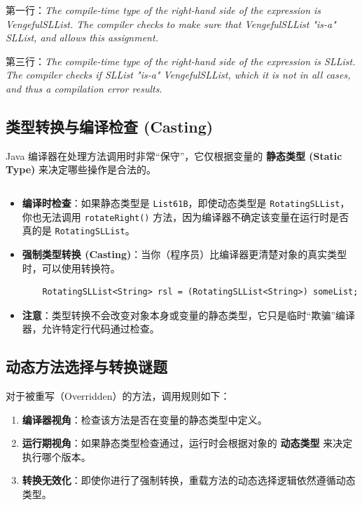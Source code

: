\documentclass[12pt, a4paper, openany]{ctexbook} %
\begin{document}
\par
第一行：\textit{The compile-time type of the right-hand side of the expression is VengefulSLList. The compiler checks to make sure that VengefulSLList "is-a" SLList, and allows this assignment.}
\par
第三行：\textit{The compile-time type of the right-hand side of the expression is SLList. The compiler checks if SLList "is-a" VengefulSLList, which it is not in all cases, and thus a compilation error results.}



\subsection{类型转换与编译检查 (Casting)}
Java 编译器在处理方法调用时非常“保守”，它仅根据变量的 \textbf{静态类型 (Static Type)} 来决定哪些操作是合法的。
\begin{lstlisting}

\end{lstlisting}

\begin{itemize}
    \item \textbf{编译时检查}：如果静态类型是 \texttt{List61B}，即使动态类型是 \texttt{RotatingSLList}，你也无法调用 \texttt{rotateRight()} 方法，因为编译器不确定该变量在运行时是否真的是 \texttt{RotatingSLList}。
    \item \textbf{强制类型转换 (Casting)}：当你（程序员）比编译器更清楚对象的真实类型时，可以使用转换符。
    \begin{lstlisting}
    RotatingSLList<String> rsl = (RotatingSLList<String>) someList;
    \end{lstlisting}
    \item \textbf{注意}：类型转换不会改变对象本身或变量的静态类型，它只是临时“欺骗”编译器，允许特定行代码通过检查。
\end{itemize}

\subsection{动态方法选择与转换谜题}
对于被重写（Overridden）的方法，调用规则如下：
\begin{enumerate}
    \item \textbf{编译器视角}：检查该方法是否在变量的静态类型中定义。
    \item \textbf{运行期视角}：如果静态类型检查通过，运行时会根据对象的 \textbf{动态类型} 来决定执行哪个版本。
    \item \textbf{转换无效化}：即使你进行了强制转换，重载方法的动态选择逻辑依然遵循动态类型。
\end{enumerate}
\end{document}
